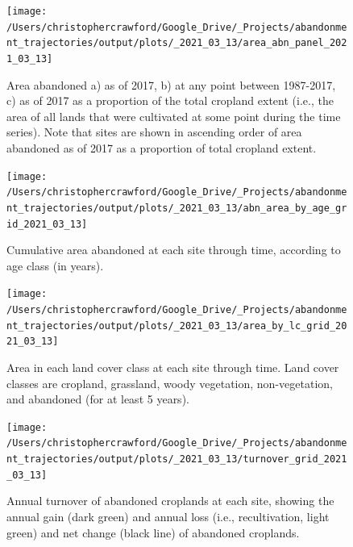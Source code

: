 \documentclass[
]{article}
\begin{document}
\begin{figure}
\texttt{[image: /Users/christophercrawford/Google\_Drive/\_Projects/abandonment\_trajectories/output/plots/\_2021\_03\_13/area\_abn\_panel\_2021\_03\_13]} \caption{Area abandoned a) as of 2017, b) at any point between 1987-2017, c) as of 2017 as a proportion of the total cropland extent (i.e., the area of all lands that were cultivated at some point during the time series). Note that sites are shown in ascending order of area abandoned as of 2017 as a proportion of total cropland extent.}\label{fig:area-abn-panel}
\end{figure}



\begin{figure}
\texttt{[image: /Users/christophercrawford/Google\_Drive/\_Projects/abandonment\_trajectories/output/plots/\_2021\_03\_13/abn\_area\_by\_age\_grid\_2021\_03\_13]} \caption{Cumulative area abandoned at each site through time, according to age class (in years).}\label{fig:area-abn-by-age-class}
\end{figure}



\begin{figure}
\texttt{[image: /Users/christophercrawford/Google\_Drive/\_Projects/abandonment\_trajectories/output/plots/\_2021\_03\_13/area\_by\_lc\_grid\_2021\_03\_13]} \caption{Area in each land cover class at each site through time. Land cover classes are cropland, grassland, woody vegetation, non-vegetation, and abandoned (for at least 5 years).}\label{fig:area-by-lc}
\end{figure}



\begin{figure}
\texttt{[image: /Users/christophercrawford/Google\_Drive/\_Projects/abandonment\_trajectories/output/plots/\_2021\_03\_13/turnover\_grid\_2021\_03\_13]} \caption{Annual turnover of abandoned croplands at each site, showing the annual gain (dark green) and annual loss (i.e., recultivation, light green) and net change (black line) of abandoned croplands.}\label{fig:turnover-grid}
\end{figure}
\end{document}

